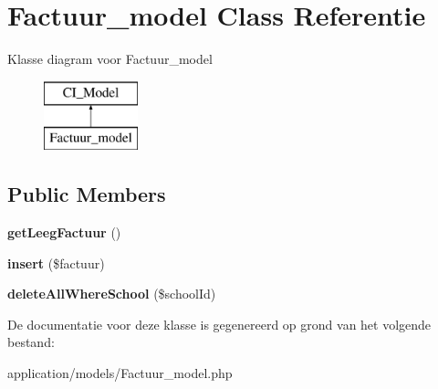 \hypertarget{class_factuur__model}{}\section{Factuur\+\_\+model Class Referentie}
\label{class_factuur__model}
Klasse diagram voor Factuur\+\_\+model\begin{figure}[H]
\begin{center}
\leavevmode
\includegraphics[height=2.000000cm]{class_factuur__model}
\end{center}
\end{figure}
\subsection*{Public Members}
\begin{DoxyCompactItemize}
\item 
\mbox{\label{class_factuur__model_af89dcdf2425b061f17d8eb64c6483a59}} 
{\bfseries get\+Leeg\+Factuur} ()
\item 
\mbox{\label{class_factuur__model_a66463b8065317f2753b0b5ae8446e343}} 
{\bfseries insert} (\$factuur)
\item 
\mbox{\label{class_factuur__model_a858f0f0a43114d19bc6d7a2cf94e74c6}} 
{\bfseries delete\+All\+Where\+School} (\$school\+Id)
\end{DoxyCompactItemize}


De documentatie voor deze klasse is gegenereerd op grond van het volgende bestand\+:\begin{DoxyCompactItemize}
\item 
application/models/Factuur\+\_\+model.\+php\end{DoxyCompactItemize}
